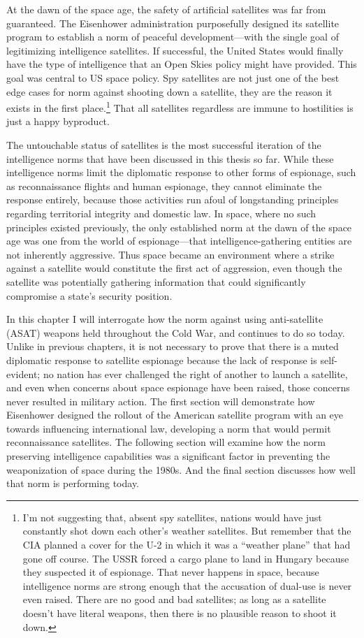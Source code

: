 \documentclass{report}
\begin{document}
At the dawn of the space age, the safety of artificial satellites was far from guaranteed. The Eisenhower administration purposefully designed its satellite program to establish a norm of peaceful development---with the single goal of legitimizing intelligence satellites. If successful, the United States would finally have the type of intelligence that an Open Skies policy might have provided. This goal was central to US space policy. Spy satellites are not just one of the best edge cases for norm against shooting down a satellite, they are the reason it exists in the first place.\footnote{I'm not suggesting that, absent spy satellites, nations would have just constantly shot down each other's weather satellites. But remember that the CIA planned a cover for the U-2 in which it was a ``weather plane'' that had gone off course. The USSR forced a cargo plane to land in Hungary because they suspected it of espionage. That never happens in space, because intelligence norms are strong enough that the accusation of dual-use is never even raised. There are no good and bad satellites; as long as a satellite doesn't have literal weapons, then there is no plausible reason to shoot it down.} That all satellites regardless are immune to hostilities is just a happy byproduct.

The untouchable status of satellites is the most successful iteration of the intelligence norms that have been discussed in this thesis so far. While these intelligence norms limit the diplomatic response to other forms of espionage, such as reconnaissance flights and human espionage, they cannot eliminate the response entirely, because those activities run afoul of longstanding principles regarding territorial integrity and domestic law. In space, where no such principles existed previously, the only established norm at the dawn of the space age was one from the world of espionage---that intelligence-gathering entities are not inherently aggressive. Thus space became an environment where a strike against a satellite would constitute the first act of aggression, even though the satellite was potentially gathering information that could significantly compromise a state's security position.

In this chapter I will interrogate how the norm against using anti-satellite (ASAT) weapons held throughout the Cold War, and continues to do so today. Unlike in previous chapters, it is not necessary to prove that there is a muted diplomatic response to satellite espionage because the lack of response is self-evident; no nation has ever challenged the right of another to launch a satellite, and even when concerns about space espionage have been raised, those concerns never resulted in military action. The first section will demonstrate how Eisenhower designed the rollout of the American satellite program with an eye towards influencing international law, developing a norm that would permit reconnaissance satellites. The following section will examine how the norm preserving intelligence capabilities was a significant factor in preventing the weaponization of space during the 1980s. And the final section discusses how well that norm is performing today.
\end{document}
